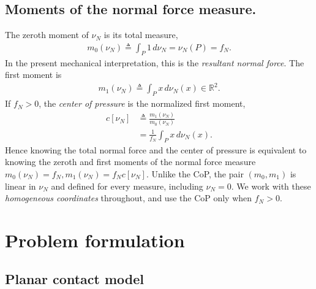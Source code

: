 \documentclass[11pt,a4paper]{article}
\theoremstyle{plain}
\begin{document}
\subsection{Moments of the normal force measure.}
The zeroth moment of $\nu_N$ is its total measure,
\begin{align}
m_0(\nu_N) \triangleq \int_P 1\,d\nu_N = \nu_N(P) = f_N.
\end{align}
In the present mechanical interpretation, this is the \textit{resultant normal force}. The first moment is
\begin{align}
m_1(\nu_N) \triangleq \int_P x\,d\nu_N(x)\in\mathbb R^2.
\end{align}
If $f_N>0$, the \textit{center of pressure} is the normalized first moment,
\begin{align}
c[\nu_N] &\triangleq \frac{m_1(\nu_N)}{m_0(\nu_N)} \\
         & = \frac{1}{f_N} \int_P x\,d\nu_N(x).
\end{align}
Hence knowing the total normal force and the center of pressure is equivalent to knowing the zeroth and first moments of the normal force measure $m_0(\nu_N)=f_N, m_1(\nu_N)=f_Nc[\nu_N]$.
Unlike the CoP, the pair $(m_0,m_1)$ is linear in $\nu_N$ and defined for every measure, including $\nu_N=0$. We work with these \textit{homogeneous coordinates} throughout, and use the CoP only when $f_N>0$.


\section{Problem formulation}
\subsection{Planar contact model}
\end{document}
